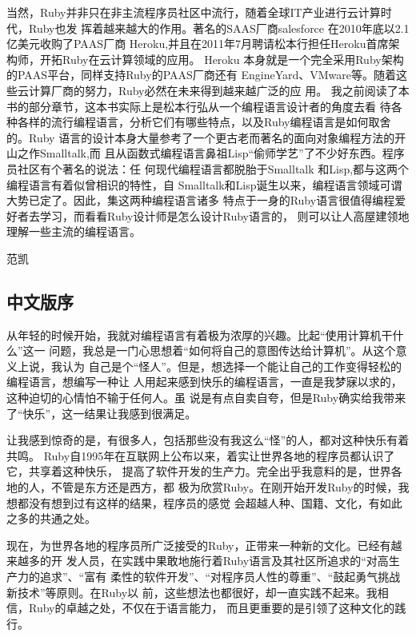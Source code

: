 \documentclass[11pt]{ctexart}
\begin{document}
当然，Ruby并非只在非主流程序员社区中流行，随着全球IT产业进行云计算时代，Ruby也发
挥着越来越大的作用。著名的SAAS厂商salesforce 在2010年底以2.1亿美元收购了PAAS厂商
Heroku,并且在2011年7月聘请松本行担任Heroku首席架构师，开拓Ruby在云计算领域的应用。
Heroku 本身就是一个完全采用Ruby架构的PAAS平台，同样支持Ruby的PAAS厂商还有
EngineYard、VMware等。随着这些云计算厂商的努力，Ruby必然在未来得到越来越广泛的应
用。
我之前阅读了本书的部分章节，这本书实际上是松本行弘从一个编程语言设计者的角度去看
待各种各样的流行编程语言，分析它们有哪些特点，以及Ruby编程语言是如何取舍的。Ruby
语言的设计本身大量参考了一个更古老而著名的面向对象编程方法的开山之作Smalltalk,而
且从函数式编程语言鼻祖Lisp“偷师学艺”了不少好东西。程序员社区有个著名的说法：任
何现代编程语言都脱胎于Smalltalk 和Lisp,都与这两个编程语言有着似曾相识的特性，自
Smalltalk和Lisp诞生以来，编程语言领域可谓大势已定了。因此，集这两种编程语言诸多
特点于一身的Ruby语言很值得编程爱好者去学习，而看看Ruby设计师是怎么设计Ruby语言的，
则可以让人高屋建领地理解一些主流的编程语言。

范凯
\begin{LaTeX}
\newpage
\end{LaTeX}

\subsection{中文版序}
\label{sec:orge498992}

从年轻的时候开始，我就对编程语言有着极为浓厚的兴趣。比起“使用计算机干什么”这一
问题，我总是一门心思想着“如何将自己的意图传达给计算机”。从这个意义上说，我认为
自己是个“怪人”。但是，想选择一个能让自己的工作变得轻松的编程语言，想编写一种让
人用起来感到快乐的编程语言，一直是我梦寐以求的，这种迫切的心情怕不输于任何人。虽
说是有点自卖自夸，但是Ruby确实给我带来了“快乐”，这一结果让我感到很满足。

让我感到惊奇的是，有很多人，包括那些没有我这么“怪”的人，都对这种快乐有着共鸣。
Ruby自1995年在互联网上公布以来，着实让世界各地的程序员都认识了它，共享着这种快乐，
提高了软件开发的生产力。完全出乎我意料的是，世界各地的人，不管是东方还是西方，都
极为欣赏Ruby。在刚开始开发Ruby的时候，我想都没有想到过有这样的结果，程序员的感觉
会超越人种、国籍、文化，有如此之多的共通之处。

现在，为世界各地的程序员所广泛接受的Ruby，正带来一种新的文化。已经有越来越多的开
发人员，在实践中果敢地施行着Ruby语言及其社区所追求的“对高生产力的追求”、“富有
柔性的软件开发”、“对程序员人性的尊重”、“鼓起勇气挑战新技术”等原则。在Ruby以
前，这些想法也都很好，却一直实践不起来。我相信，Ruby的卓越之处，不仅在于语言能力，
而且更重要的是引领了这种文化的践行。
\end{document}
